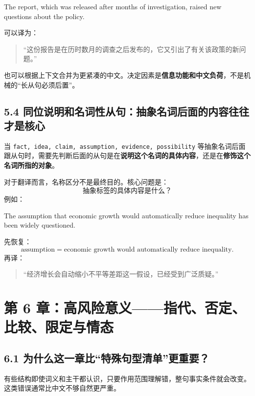 \documentclass[11pt,a4paper]{ctexart}
\newcommand{\kw}[1]{\textbf{#1}}
\begin{document}
\begin{eng}[例 13：补充信息更适合分句]
The report, which was released after months of investigation, raised new questions about the policy.
\end{eng}
可以译为：
\begin{quote}
“这份报告是在历时数月的调查之后发布的，它又引出了有关该政策的新问题。”
\end{quote}
也可以根据上下文合并为更紧凑的中文。决定因素是\kw{信息功能和中文负荷}，不是机械的“长从句必须后置”。

\subsection{5.4 同位说明和名词性从句：抽象名词后面的内容往往才是核心}
当 \texttt{fact, idea, claim, assumption, evidence, possibility} 等抽象名词后面跟从句时，需要先判断后面的从句是在\kw{说明这个名词的具体内容}，还是在\kw{修饰这个名词所指的对象}。

对于翻译而言，名称区分不是最终目的。核心问题是：
\[
\boxed{\text{抽象标签的具体内容是什么？}}
\]
例如：
\begin{eng}[例 14]
The assumption that economic growth would automatically reduce inequality has been widely questioned.
\end{eng}
先恢复：
\[
\text{assumption} = \text{economic growth would automatically reduce inequality}.
\]
再译：
\begin{quote}
“经济增长会自动缩小不平等差距这一假设，已经受到广泛质疑。”
\end{quote}

\newpage
\section{第 6 章：高风险意义——指代、否定、比较、限定与情态}

\subsection{6.1 为什么这一章比“特殊句型清单”更重要？}
有些结构即使词义和主干都认识，只要作用范围理解错，整句事实条件就会改变。这类错误通常比中文不够自然更严重。
\end{document}
